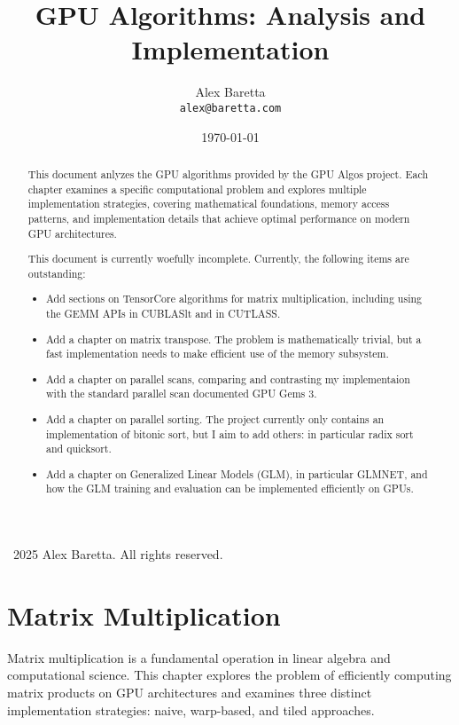 \documentclass{amsbook}
\title{GPU Algorithms: Analysis and Implementation}
\author{Alex Baretta \\
        \texttt{alex@baretta.com}}
\date{\today}
\theoremstyle{definition}
\begin{document}
\begin{abstract}
This document anlyzes the GPU algorithms provided by the GPU Algos project. Each chapter examines a specific computational problem and explores multiple implementation strategies, covering mathematical foundations, memory access patterns, and implementation details that achieve optimal performance on modern GPU architectures.

This document is currently woefully incomplete. Currently, the following items are outstanding:
\begin{itemize}
    \item Add sections on TensorCore algorithms for matrix multiplication, including using the GEMM APIs in CUBLASlt and in CUTLASS.
    \item Add a chapter on matrix transpose. The problem is mathematically trivial, but a fast implementation needs to make efficient use of the memory subsystem.
    \item Add a chapter on parallel scans, comparing and contrasting my implementaion with the standard parallel scan documented GPU Gems 3.
    \item Add a chapter on parallel sorting. The project currently only contains an implementation of bitonic sort, but I aim to add others: in particular radix sort and quicksort.
    \item Add a chapter on Generalized Linear Models (GLM), in particular GLMNET, and how the GLM training and evaluation can be implemented efficiently on GPUs.
\end{itemize}
\end{abstract}

\maketitle
\vspace*{\fill}
\begin{center}
    \textcopyright\ 2025 Alex Baretta. All rights reserved.
\end{center}
\vspace*{\fill}

\tableofcontents


\chapter{Matrix Multiplication}

Matrix multiplication is a fundamental operation in linear algebra and computational science. This chapter explores the problem of efficiently computing matrix products on GPU architectures and examines three distinct implementation strategies: naive, warp-based, and tiled approaches.
\end{document}
